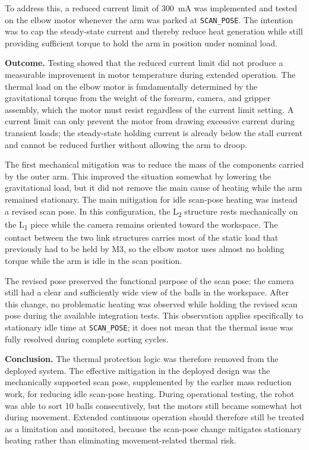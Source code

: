 To address this, a reduced current limit of 300~mA was
implemented and tested on the elbow motor whenever the arm
was parked at \texttt{SCAN\_POSE}. The intention was to cap
the steady-state current and thereby reduce heat generation
while still providing sufficient torque to hold the arm in
position under nominal load.

\textbf{Outcome.}
Testing showed that the reduced current limit did not
produce a measurable improvement in motor temperature
during extended operation. The thermal load on the elbow
motor is fundamentally determined by the gravitational
torque from the weight of the forearm, camera, and gripper
assembly, which the motor must resist regardless of the
current limit setting. A current limit can only prevent
the motor from drawing excessive current during transient
loads; the steady-state holding current is already below
the stall current and cannot be reduced further without
allowing the arm to droop.

The first mechanical mitigation was to reduce the mass of the
components carried by the outer arm. This improved the situation
somewhat by lowering the gravitational load, but it did not remove
the main cause of heating while the arm remained stationary. The
main mitigation for idle scan-pose heating was instead a revised scan
pose. In this configuration, the L\textsubscript{2} structure rests
mechanically on the L\textsubscript{1} piece while the camera remains
oriented toward the workspace. The contact between the two link
structures carries most of the static load that previously had to be
held by M3, so the elbow motor uses almost no holding torque while the
arm is idle in the scan position.

The revised pose preserved the functional purpose of the scan pose: the
camera still had a clear and sufficiently wide view of the balls in the
workspace. After this change, no problematic heating was observed while
holding the revised scan pose during the available integration tests.
This observation applies specifically to stationary idle time at
\texttt{SCAN\_POSE}; it does not mean that the thermal issue was fully
resolved during complete sorting cycles.

\textbf{Conclusion.}
The thermal protection logic was therefore removed from the
deployed system. The effective mitigation in the deployed design was
the mechanically supported scan pose, supplemented by the earlier mass
reduction work, for reducing idle scan-pose heating. During operational
testing, the robot was able to sort 10 balls consecutively, but the
motors still became somewhat hot during movement. Extended continuous
operation should therefore still be treated as a limitation and
monitored, because the scan-pose change mitigates stationary heating
rather than eliminating movement-related thermal risk.
